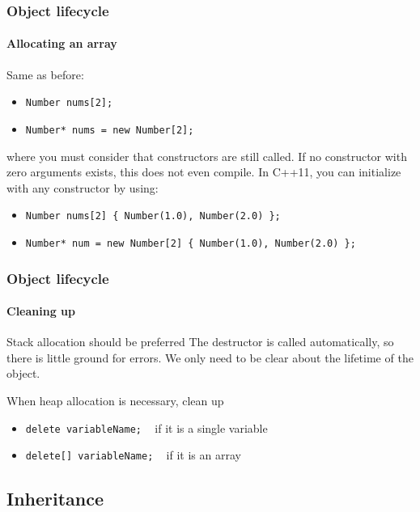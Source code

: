 \begin{frame}
\frametitle{Object lifecycle}
\framesubtitle{Allocating an array}

\begin{block}{Same as before:}
\begin{itemize}
\item \texttt{Number nums[2]; }
\item \texttt{Number* nums = new Number[2]; }
\end{itemize}
where you must consider that constructors are still called. If no constructor with zero arguments exists, this does not even compile. In C++11, you can initialize with
any constructor by using:
\begin{itemize}
\item \texttt{Number nums[2] \{ Number(1.0), Number(2.0) \}; }
\item \texttt{Number* num = new Number[2] \{ Number(1.0), Number(2.0) \}; }
\end{itemize}
\end{block}

\end{frame}

\begin{frame}
\frametitle{Object lifecycle}
\framesubtitle{Cleaning up}

\begin{block}{Stack allocation should be preferred}
The destructor is called automatically, so there is little ground for errors. We only need to be clear about the lifetime of the object.
\end{block}
\pause
\begin{block}{When heap allocation is necessary, clean up}
\begin{itemize}
\item \texttt{delete variableName;} \,\,\, if it is a single variable
\item \texttt{delete[] variableName;} \,\,\, if it is an array
\end{itemize}
\end{block}
\end{frame}

\subsection{Inheritance}

